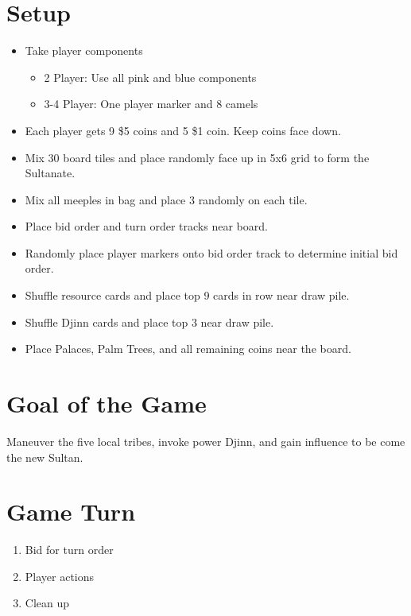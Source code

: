 \documentclass[12pt]{article}
\newenvironment{enumerateCustom}
{\begin{enumerate}
  \setlength{\itemsep}{1pt}
  \setlength{\parskip}{0pt}
  \setlength{\parsep}{0pt}}
{\end{enumerate}}
\newenvironment{itemizeCustom}
{\begin{itemize}
  \setlength{\itemsep}{1pt}
  \setlength{\parskip}{0pt}
  \setlength{\parsep}{0pt}}
{\end{itemize}}
\begin{document}
\begin{multicols*}{2}

\section*{Setup}
\begin{itemizeCustom}
    \item Take player components
        \begin{itemizeCustom}
            \item 2 Player: Use all pink and blue components
            \item 3-4 Player: One player marker and 8 camels
        \end{itemizeCustom}
    \item Each player gets 9 \$5 coins and 5 \$1 coin. Keep coins face down.
    \item Mix 30 board tiles and place randomly face up in 5x6 grid to form the Sultanate.
    \item Mix all meeples in bag and place 3 randomly on each tile.
    \item Place bid order and turn order tracks near board.
    \item Randomly place player markers onto bid order track to determine initial bid order.
    \item Shuffle resource cards and place top 9 cards in row near draw pile.
    \item Shuffle Djinn cards and place top 3 near draw pile.
    \item Place Palaces, Palm Trees, and all remaining coins near the board.
\end{itemizeCustom}

\section*{Goal of the Game}
Maneuver the five local tribes, invoke power Djinn, and gain influence to be come the new Sultan.

\section*{Game Turn}
\begin{enumerateCustom}
    \item Bid for turn order
    \item Player actions
    \item Clean up
\end{enumerateCustom}


\end{multicols*}
\end{document}
